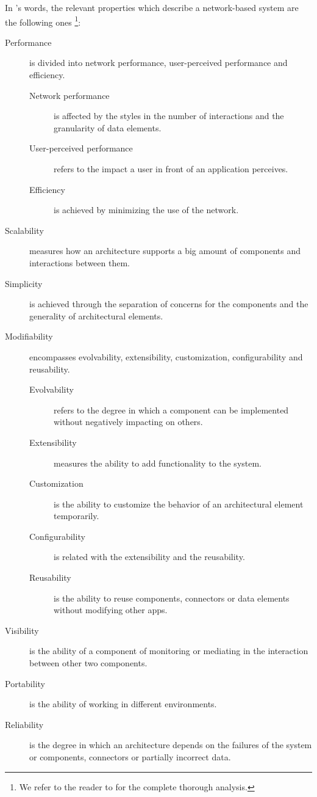 In \citeauthor{fielding_architectural_2000}'s words, the relevant properties which describe a network-based system are the following ones \footnote{We refer to the reader to \citet{fielding_architectural_2000} for the complete thorough analysis.}:
\begin{description}
  \item[Performance] is divided into network performance, user-perceived performance and efficiency.
    \begin{description}
      \item[Network performance] is affected by the styles in the number of interactions and the granularity of data elements.
      \item[User-perceived performance] refers to the impact a user in front of an application perceives. %
      \item[Efficiency] is achieved by minimizing the use of the network.
    \end{description}
  \item[Scalability] measures how an architecture supports a big amount of components and interactions between them.
  \item[Simplicity] is achieved through the separation of concerns for the components and the generality of architectural elements.
  \item[Modifiability] encompasses evolvability, extensibility, customization, configurability and reusability.
    \begin{description}
      \item[Evolvability] refers to the degree in which a component can be implemented without negatively impacting on others.
      \item[Extensibility] measures the ability to add functionality to the system.
      \item[Customization] is the ability to customize the behavior of an architectural element temporarily.
      \item[Configurability] is related with the extensibility and the reusability.
      \item[Reusability] is the ability to reuse components, connectors or data elements without modifying other apps.
    \end{description}
  \item[Visibility] is the ability of a component of monitoring or mediating in the interaction between other two components.
  \item[Portability] is the ability of working in different environments.
  \item[Reliability] is the degree in which an architecture depends on the failures of the system or components, connectors or partially incorrect data.
\end{description}

